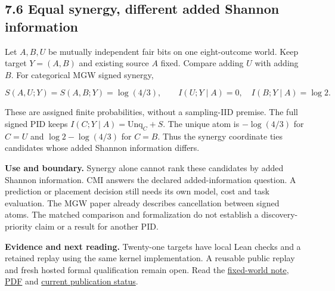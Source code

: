 \documentclass[
  11pt,
  a4paper,
]{article}
\begin{document}

\subsection{7.6 Equal synergy, different added Shannon
information}\label{76-equal-synergy-different-added-shannon-information}

Let \(A,B,U\) be mutually independent fair bits on one eight-outcome
world. Keep target \(Y=(A,B)\) and existing source \(A\) fixed. Compare
adding \(U\) with adding \(B\). For categorical MGW signed synergy,

\[
S(A,U;Y)=S(A,B;Y)=\log(4/3),\qquad
I(U;Y\mid A)=0,\quad I(B;Y\mid A)=\log2.
\]

These are assigned finite probabilities, without a sampling-IID premise.
The full signed PID keeps \(I(C;Y\mid A)=\mathrm{Unq}_C+S\). The unique
atom is \(-\log(4/3)\) for \(C=U\) and \(\log2-\log(4/3)\) for \(C=B\).
Thus the synergy coordinate ties candidates whose added Shannon
information differs.

\textbf{Use and boundary.} Synergy alone cannot rank these candidates by
added Shannon information. CMI answers the declared added-information
question. A prediction or placement decision still needs its own model,
cost and task evaluation. The MGW paper already describes cancellation
between signed atoms. The matched comparison and formalization do not
establish a discovery-priority claim or a result for another PID.

\textbf{Evidence and next reading.} Twenty-one targets have local Lean
checks and a retained replay using the same kernel implementation. A
reusable public replay and fresh hosted formal qualification remain
open. Read the
\href{https://github.com/sepahead/pid-rs/blob/main/audit/evidence/mgw-fixed-world-added-information-2026-09-09.md}{fixed-world
note},
\href{https://github.com/sepahead/pid-rs/blob/main/output/pdf/mgw-fixed-world-added-information.pdf}{PDF}
and
\href{https://github.com/sepahead/pid-rs/blob/main/audit/formal/lean-mgw-fixed-world/PUBLICATION.md}{current
publication status}.
\end{document}
